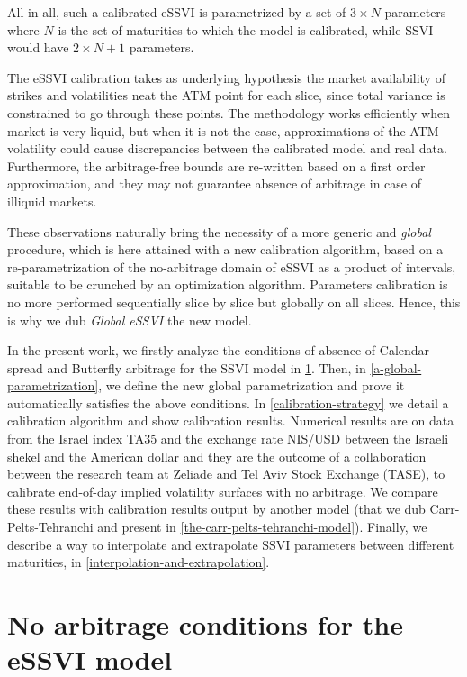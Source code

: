 \documentclass{article}
\begin{document}
All in all, such a calibrated eSSVI is parametrized by a set of
\(3 \times N\) parameters where \(N\) is the set of maturities to which
the model is calibrated, while SSVI would have \(2\times N+1\)
parameters.

The eSSVI calibration takes as underlying hypothesis the market
availability of strikes and volatilities neat the ATM point for each
slice, since total variance is constrained to go through these points.
The methodology works efficiently when market is very liquid, but when
it is not the case, approximations of the ATM volatility could cause
discrepancies between the calibrated model and real data. Furthermore,
the arbitrage-free bounds are re-written based on a first order
approximation, and they may not guarantee absence of arbitrage in case
of illiquid markets.

These observations naturally bring the necessity of a more generic and
\emph{global} procedure, which is here attained with a new calibration
algorithm, based on a re-parametrization of the no-arbitrage domain of
eSSVI as a product of intervals, suitable to be crunched by an
optimization algorithm. Parameters calibration is no more performed
sequentially slice by slice but globally on all slices. Hence, this is
why we dub \emph{Global eSSVI} the new model.

	In the present work, we firstly analyze the conditions of absence of
Calendar spread and Butterfly arbitrage for the SSVI model in
\cref{no-arbitrage-conditions-for-the-essvi-model}. Then, in
\cref{a-global-parametrization}, we define the new global
parametrization and prove it automatically satisfies the above
conditions. In \cref{calibration-strategy} we detail a calibration
algorithm and show calibration results. Numerical results are on data
from the Israel index TA35 and the exchange rate NIS/USD between the
Israeli shekel and the American dollar and they are the outcome of a
collaboration between the research team at Zeliade and Tel Aviv Stock
Exchange (TASE), to calibrate end-of-day implied volatility surfaces
with no arbitrage. We compare these results with calibration results
output by another model (that we dub Carr-Pelts-Tehranchi and present in
\cref{the-carr-pelts-tehranchi-model}). Finally, we describe a way to
interpolate and extrapolate SSVI parameters between different
maturities, in \cref{interpolation-and-extrapolation}.


	\hypertarget{no-arbitrage-conditions-for-the-essvi-model}{%
\section{No arbitrage conditions for the eSSVI
model}\label{no-arbitrage-conditions-for-the-essvi-model}}
\end{document}
